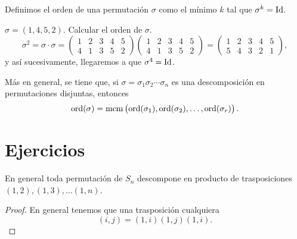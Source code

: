 \begin{defi}
    Definimos el orden de una permutación $\sigma$ como el mínimo $k$ tal que $\sigma^k = \operatorname{Id}$.
\end{defi}

\begin{example}
    $\sigma = (1, 4, 5, 2)$. Calcular el orden de $\sigma$.
    \[
        \sigma^2 = \sigma \cdot \sigma =
        \begin{pmatrix}
            1 & 2 & 3 & 4 & 5 \\
            4 & 1 & 3 & 5 &2
        \end{pmatrix}
        \begin{pmatrix}
            1 & 2 & 3 & 4 & 5 \\
            4 & 1 & 3 & 5 & 2
        \end{pmatrix} = 
        \begin{pmatrix}
            1 & 2 & 3 & 4 & 5 \\
            5 & 4 & 3 & 2 & 1
        \end{pmatrix},
    \]
    y así sucesivamente, llegaremos a que $\sigma^4 = \operatorname{Id}$.
\end{example}

\begin{prop}
Más en general, se tiene que, si $\sigma = \sigma_1 \sigma_2 \cdots \sigma_n$ es una descomposición en permutaciones disjuntas, entonces
\[
    \operatorname{ord}(\sigma) = \operatorname{mcm} \left( \operatorname{ord} (\sigma_1), \operatorname{ord}(\sigma_2), \dots, \operatorname{ord}(\sigma_r) \right).
\]
\end{prop}

\section{Ejercicios}

\begin{ej} %
    En general toda permutación de $S_n$ descompone en producto de trasposiciones
    $(1, 2), (1, 3), \dots (1, n)$.
\end{ej}

\begin{proof}
    En general tenemos que una trasposición cualquiera
    \[
        (i, j) = (1, i)(1, j)(1,i).
    \]
\end{proof}

